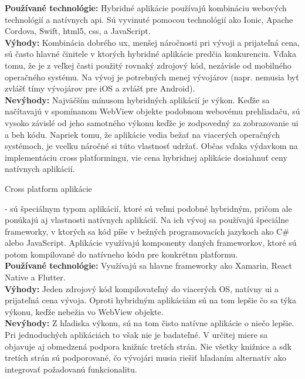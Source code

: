 \begin{itemize}[leftmargin=*]
{\bf Používané technológie:} Hybridné aplikácie používajú kombináciu webových technológií a natívnych \acrshort{api}. Sú vyvinuté pomocou technológií ako Ionic, Apache Cordova, Swift, \acrshort{html}5, \acrshort{css}, a JavaScript. \cite{ma3} \\

{\bf Výhody:} Kombinácia dobrého \acrshort{ux}, menšej náročnosti pri vývoji a prijateľná cena, sú často hlavné činitele v ktorých hybridné aplikácie predčia konkurenciu. Vďaka tomu, že je z veľkej časti použitý rovnaký zdrojový kód, nezávisle od mobilného operačného systému. Na vývoj je potrebných menej vývojárov (napr. nemusia byť zvlášť tímy vývojárov pre iOS a zvlášť pre Android). \cite{ma4} \\
 
{\bf Nevýhody:} Najväčším mínusom hybridných aplikácií je výkon. Keďže sa načítavajú v spomínanom WebView objekte podobnom webovému prehliadaču, sú vysoko závislé od jeho samotného výkonu keďže je zodpovedný za zobrazovanie \acrshort{ui} a beh kódu. Napriek tomu, že aplikácie vedia bežať na viacerých operačných systémoch, je vcelku náročné si túto vlastnosť udržať. Občas vďaka výdavkom na implementáciu cross platformingu, vie cena hybridnej aplikácie dosiahnuť ceny natívnych aplikácií. \cite{ma4} \cite{ma5} \\

{\bf \item Cross platform aplikácie} - sú špeciálnym typom aplikácií, ktoré sú veľmi podobné hybridným, pričom ale ponúkajú aj vlastnosti natívnych aplikácií. Na ich vývoj sa používajú špeciálne frameworky, v ktorých sa kód píše v bežných programovacích jazykoch ako C\# alebo JavaScript. Aplikácie využívajú komponenty daných frameworkov, ktoré sú potom kompilované do natívneho kódu pre konkrétnu platformu. \\

{\bf Používané technológie:} Využívajú sa hlavne frameworky ako Xamarin, React Native a Flutter. \cite{ma6} \\

{\bf Výhody:} Jeden zdrojový kód kompilovateľný do viacerých OS, natívny \acrshort{ui} a prijateľná cena vývoja. Oproti hybridným aplikáciám sú na tom lepšie čo sa týka výkonu, keďže nebežia vo WebView objekte. \\
 
{\bf Nevýhody:} Z hľadiska výkonu, sú na tom čisto natívne aplikácie o niečo lepšie. Pri jednoduchých aplikáciách to však nie je badateľné. V určitej miere sa objavuje aj obmedzená podpora knižníc tretích strán. Nie všetky knižnice a \acrshort{sdk} tretích strán sú podporované, čo vývojári musia riešiť hľadaním alternatív ako integrovať požadovanú funkcionalitu. \cite{ma6} \\
\end{itemize}

